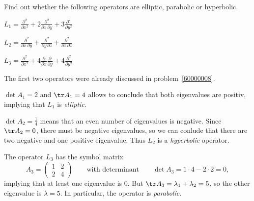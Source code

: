 Find out whether the following operators are elliptic, parabolic or
hyperbolic.
\begin{teilaufgaben}
\item
$
\displaystyle
L_1
=
\frac{\partial^2}{\partial x^2}
+
2\frac{\partial^2}{\partial x\,\partial y}
+
3\frac{\partial^2}{\partial y^2}
$
\item
$
\displaystyle
L_2
=
\frac{\partial^2}{\partial x\,\partial y}
+
\frac{\partial^2}{\partial y\,\partial z}
+
\frac{\partial^2}{\partial z\,\partial x}
$
\item
$
\displaystyle
L_3
=
\frac{\partial^2}{\partial x^2}
+
4\frac{\partial }{\partial x}\frac{\partial }{\partial y}
+
4\frac{\partial^2}{\partial y^2}
$
\end{teilaufgaben}

\begin{loesung}
The first two operators were already discussed in problem~\ref{60000008}.
\begin{teilaufgaben}
\item 
$\det A_1 = 2$ and $\tr A_1=4$ allows to conclude that both eigenvalues
are positiv, implying that $L_1$ is {\em elliptic}.
\item
$\det A_2 = \frac14$ means that an even number of
eigenvalues is negative.
Since $\tr A_2=0$, there must be negative eigenvalues, so we can conlude
that there are two negative and one positive eigenvalue.
Thus $L_2$ is a {\em hyperbolic} operator.
\item
The operator $L_3$ has the symbol matrix
\[
A_3
=
\begin{pmatrix}
1&2\\
2&4
\end{pmatrix}
\qquad
\text{with determinant}
\qquad
\det A_3
=
1\cdot 4 - 2\cdot 2
=
0,
\]
implying that at least one eigenvalue is $0$.
But $\tr A_3 =\lambda_1+\lambda_2 = 5$, so the other eigenvalue is
$\lambda=5$.
In particular, the operator is {\em parabolic}.
\qedhere
\end{teilaufgaben}
\end{loesung}
